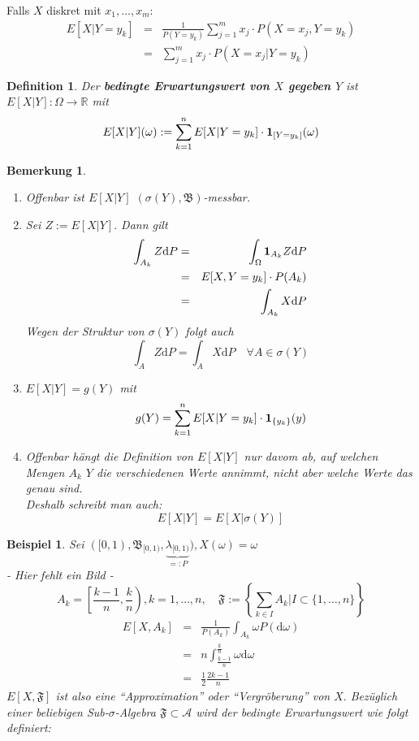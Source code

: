 \documentclass[a4paper,11pt]{book}
\newcommand{\R}{{\mathbb R}}
\newcommand{\ind}{\text{\bf{1}}}
\def\AA{ \mathcal{A} }
\def\FF{ \mathfrak{F} }
\def\BB{ \mathfrak{B} }
\def\d{\mbox{d}}
\newtheorem*{DefON}{Definition}
\newtheorem{Bsp}{Beispiel}[chapter]
\newtheorem*{BemON}{Bemerkung}
\theoremstyle{nonumberplain}
\begin{document}
Falls $X$ diskret mit $x_1, \ldots, x_m$:
\begin{eqnarray*}
E[X|Y=y_k] &=& \frac 1 {P(Y=y_k)} \sum_{j=1}^m x_j\cdot P(X=x_j, Y=y_k)\\
&=& \sum_{j=1}^m x_j\cdot P(X=x_j|Y=y_k)
\end{eqnarray*}

\begin{DefON} Der \textbf{bedingte Erwartungswert von $X$ gegeben $Y$}  ist $E[X|Y]:\Omega\to\R$ mit 
$$E[X|Y](\omega):=\sum_{k=1}^n E[X|Y=y_k]\cdot \ind_{[Y=y_k]}(\omega)$$
\end{DefON}

\begin{BemON}\begin{enumerate}
\item[a)] Offenbar ist $E[X|Y]$ $(\sigma(Y),\BB)$-messbar.
\item[b)] Sei $Z:=E[X|Y].$ Dann gilt
\begin{eqnarray*}
\int_{A_k} Z\d P &=& \int_\Omega \ind_{A_k} Z\d P\\
&=&E[X,Y=y_k]\cdot P(A_k)\\
&=& \int_{A_k}X\d P
\end{eqnarray*}
Wegen der Struktur von $\sigma(Y)$ folgt auch
$$\int_A Z\d P = \int_{A}X\d P\quad\forall A\in\sigma(Y)$$
\item[c)] $E[X|Y] = g(Y)$ mit
$$g(Y)=\sum_{k=1}^n E[X|Y=y_k]\cdot\ind_{\{y_k\}}(y)$$
\item[d)] Offenbar hängt die Definition von $E[X|Y]$ nur davom ab, auf welchen Mengen $A_k$ $Y$ die verschiedenen Werte annimmt, nicht aber welche Werte das genau sind.\\
Deshalb schreibt man auch:
$$E[X|Y]=E[X|\sigma(Y)]$$
\end{enumerate}
\end{BemON}

\begin{Bsp}\label{Bsp7.1} Sei $([0,1), \BB_{[0,1)}, \underbrace{\lambda_{[0,1)}}_{=:P}), X(\omega) = \omega$\\
- Hier fehlt ein Bild -\\
$$A_k=\left[\frac {k-1} n\right., \left.\frac k n\right), k = 1, \ldots, n,\quad \FF:=\left\{\sum_{k\in I} A_k| I\subset\{1,\ldots, n\}\right\}$$
\begin{eqnarray*}
E[X, A_k] &=& \frac 1 {P(A_k)} \int_{A_k}\omega P(\d\omega)\\
&=& n\int_{\frac {k-1} n}^{\frac k n} \omega\d\omega\\
&=& \frac 1 2 \frac {2k-1} n
\end{eqnarray*}
$E[X, \FF]$ ist also eine "`Approximation"' oder "`Vergröberung"' von $X.$ Bezüglich einer beliebigen Sub-$\sigma$-Algebra $\FF\subset\AA$ wird der bedingte Erwartungswert wie folgt definiert:
\end{Bsp}
\end{document}
